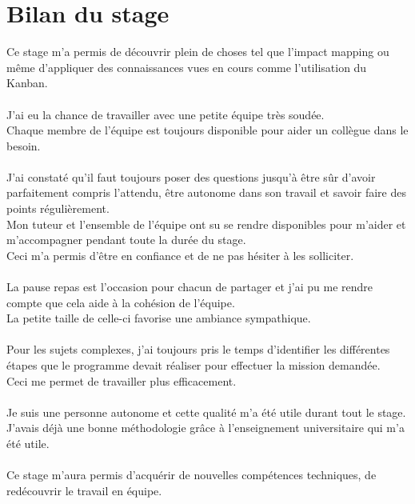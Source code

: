 \documentclass[a4paper,twoside,12pt,openright]{report}
\begin{document}
\chapter{Bilan du stage}
Ce stage m’a permis de découvrir plein de choses tel que l'impact mapping ou même d'appliquer des connaissances vues en cours comme l'utilisation du Kanban.\\\\
J'ai eu la chance de travailler avec une petite équipe très soudée.\\
Chaque membre de l'équipe est toujours disponible pour aider un collègue dans le besoin.\\\\
J’ai constaté qu’il faut toujours poser des questions jusqu'à être sûr d'avoir parfaitement compris l'attendu, être autonome dans son travail et savoir faire des points régulièrement.\\
Mon tuteur et l'ensemble de l'équipe ont su se rendre disponibles pour m'aider et m'accompagner pendant toute la durée du stage.\\
Ceci m'a permis d'être en confiance et de ne pas hésiter à les solliciter.\\\\
La pause repas est l'occasion pour chacun de partager et j'ai pu me rendre compte que cela aide à la cohésion de l'équipe.\\
La petite taille de celle-ci favorise une ambiance sympathique.\\\\
Pour les sujets complexes, j'ai toujours pris le temps d'identifier les différentes étapes que le programme devait réaliser pour effectuer la mission demandée.\\
Ceci me permet de travailler plus efficacement.\\\\
Je suis une personne autonome et cette qualité m'a été utile durant tout le stage.\\
J'avais déjà une bonne méthodologie grâce à l'enseignement universitaire qui m'a été utile.\\\\
Ce stage m'aura permis d'acquérir de nouvelles compétences techniques, de redécouvrir le travail en équipe.
\end{document}
